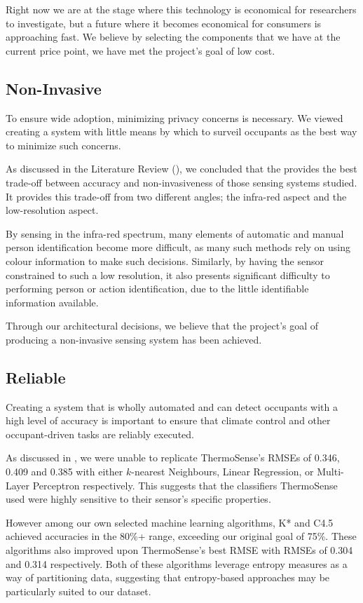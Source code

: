 \documentclass[../thesis/thesis.tex]{subfiles}
\begin{document}
Right now we are at the stage where this technology is economical for researchers to investigate, but a future where it becomes economical for consumers is approaching fast. We believe by selecting the components that we have at the current price point, we have met the project's goal of low cost.

\subsection{Non-Invasive}
To ensure wide adoption, minimizing privacy concerns is necessary. We viewed creating a system with little means by which to  surveil occupants as the best way to minimize such concerns.

As discussed in the Literature Review (), we concluded that the \mlx provides the best trade-off between accuracy and non-invasiveness of those sensing systems studied. It provides this trade-off from two different angles; the infra-red aspect and the low-resolution aspect. 

By sensing in the infra-red spectrum, many elements of automatic and manual person identification become more difficult, as many such methods rely on using colour information to make such decisions. Similarly, by having the sensor constrained to such a low resolution, it also presents significant difficulty to performing person or action identification, due to the little identifiable information available.

Through our architectural decisions, we believe that the project's goal of producing a non-invasive sensing system has been achieved.

\subsection{Reliable}
Creating a system that is wholly automated and can detect occupants with a high level of accuracy is important to ensure that climate control and other occupant-driven tasks are reliably executed.

As discussed in , we were unable to replicate ThermoSense's RMSEs of 0.346, 0.409 and 0.385 with either $k$-nearest Neighbours, Linear Regression, or Multi-Layer Perceptron respectively. This suggests that the classifiers ThermoSense used were highly sensitive to their sensor's specific properties.

However among our own selected machine learning algorithms, K* and C4.5 achieved accuracies in the 80\%+ range, exceeding our original goal of 75\%. These algorithms also improved upon ThermoSense's best RMSE with RMSEs of 0.304 and 0.314 respectively. Both of these algorithms leverage entropy measures as a way of partitioning data, suggesting that entropy-based approaches may be particularly suited to our dataset.
\end{document}
